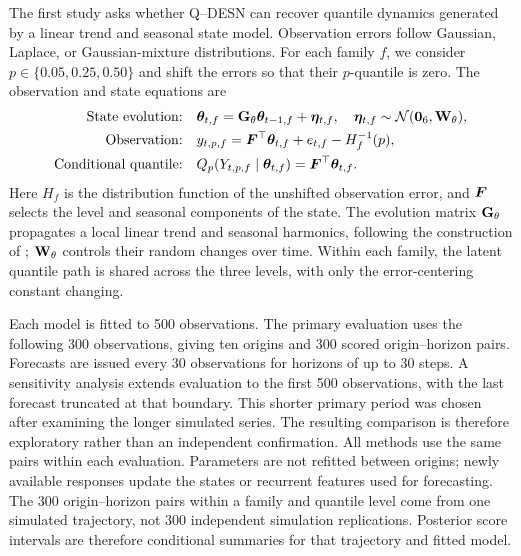 The first study asks whether Q--DESN can recover quantile dynamics generated
by a linear trend and seasonal state model. Observation errors follow
Gaussian, Laplace, or Gaussian-mixture distributions. For each family \(f\), we
consider \(p\in\{0.05,0.25,0.50\}\) and shift the errors so that their
\(p\)-quantile is zero. The observation and state equations are
\begin{equation}
\begin{aligned}
\text{State evolution:}\quad
&\boldsymbol{\theta}_{t,f}=\mathbf{G}_\theta\boldsymbol{\theta}_{t-1,f}+\boldsymbol{\eta}_{t,f},
\quad \boldsymbol{\eta}_{t,f}\sim\mathcal{N}(\boldsymbol{0}_{6},\mathbf{W}_\theta),\\
\text{Observation:}\quad
&y_{t,p,f}=\boldsymbol{F}^\top\boldsymbol{\theta}_{t,f}+e_{t,f}-H_f^{-1}(p),\\
\text{Conditional quantile:}\quad
&Q_p(Y_{t,p,f}\mid\boldsymbol{\theta}_{t,f})=\boldsymbol{F}^\top\boldsymbol{\theta}_{t,f}.
\end{aligned}
\label{qdesn2026:eq:single-quantile-dgp-main}
\end{equation}
Here \(H_f\) is the distribution function of the unshifted observation error,
and \(\boldsymbol{F}\) selects the level and seasonal components of the state.
The evolution matrix \(\mathbf{G}_\theta\) propagates a local linear trend and
seasonal harmonics, following the construction of \citet{exd-west1997bayesian};
\(\mathbf{W}_\theta\) controls their random changes over time. Within each
family, the latent quantile path is shared across the three levels, with only
the error-centering constant changing.

Each model is fitted to 500 observations. The primary evaluation uses the
following 300 observations, giving ten origins and 300 scored origin--horizon
pairs. Forecasts are issued every 30 observations for horizons of up to
30 steps. A sensitivity analysis extends evaluation to the first 500
observations, with the last forecast truncated at that boundary. This shorter
primary period was chosen after examining the longer simulated series. The
resulting comparison is therefore exploratory rather than an independent
confirmation. All methods use the same pairs within each evaluation. Parameters are not
refitted between origins; newly available responses update the states or
recurrent features used for forecasting. The 300 origin--horizon pairs within
a family and quantile level come from one simulated trajectory, not 300
independent simulation replications. Posterior score intervals are therefore
conditional summaries for that trajectory and fitted model.

